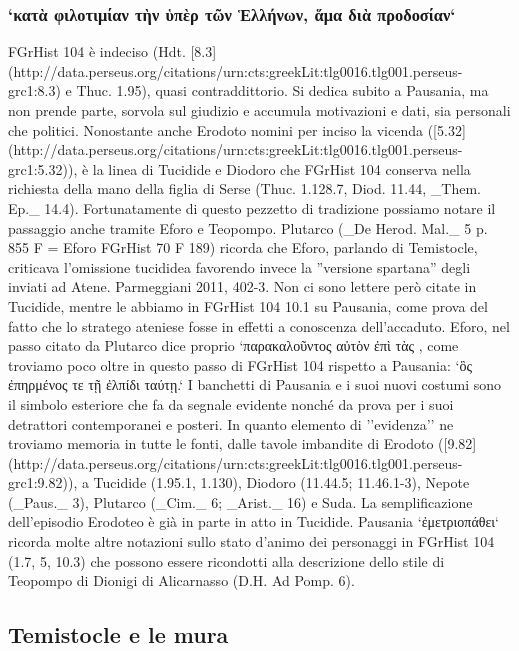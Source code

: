         \subsubsection{`κατὰ φιλοτιμίαν τὴν ὑπὲρ τῶν Ἑλλήνων, ἅμα διὰ προδοσίαν`}
        FGrHist 104 è indeciso (Hdt. [8.3](http://data.perseus.org/citations/urn:cts:greekLit:tlg0016.tlg001.perseus-grc1:8.3) e Thuc. 1.95), quasi contraddittorio. Si dedica subito a Pausania, ma non prende parte, sorvola sul giudizio e accumula motivazioni e dati, sia personali che politici. Nonostante anche Erodoto nomini per inciso la vicenda ([5.32](http://data.perseus.org/citations/urn:cts:greekLit:tlg0016.tlg001.perseus-grc1:5.32)), è la linea di Tucidide e  Diodoro che FGrHist 104 conserva nella richiesta della mano della figlia di Serse  (Thuc. 1.128.7, Diod. 11.44, _Them. Ep._  14.4). Fortunatamente di questo pezzetto di tradizione possiamo notare il passaggio anche tramite Eforo e Teopompo. Plutarco (_De Herod. Mal._ 5 p. 855 F = Eforo FGrHist 70 F 189) ricorda che Eforo, parlando di Temistocle, criticava l'omissione tucididea favorendo invece la ''versione spartana'' degli inviati ad Atene. Parmeggiani 2011, 402-3. Non ci sono lettere però citate in Tucidide, mentre le abbiamo in FGrHist 104 10.1 su Pausania, come prova del fatto che lo stratego ateniese fosse in effetti a conoscenza dell'accaduto. Eforo, nel passo citato da Plutarco dice proprio `παρακαλοῦντος αὐτὸν ἐπὶ τὰς , come troviamo poco oltre in questo passo di FGrHist 104 rispetto a Pausania: `ὃς ἐπηρμένος τε τῇ ἐλπίδι ταύτῃ.` 
            I banchetti di Pausania  e i suoi nuovi costumi sono il simbolo esteriore che fa da segnale evidente nonché da prova per i suoi detrattori contemporanei e posteri. In quanto elemento di ''evidenza'' ne troviamo memoria in tutte le fonti, dalle tavole imbandite di Erodoto ([9.82](http://data.perseus.org/citations/urn:cts:greekLit:tlg0016.tlg001.perseus-grc1:9.82)), a Tucidide (1.95.1, 1.130),  Diodoro (11.44.5; 11.46.1-3),  Nepote (_Paus._ 3), Plutarco (_Cim._ 6; _Arist._ 16) e Suda. La semplificazione dell'episodio Erodoteo è già in parte in atto in Tucidide.
            Pausania  `ἐμετριοπάθει` ricorda molte altre notazioni sullo stato d'animo dei personaggi in FGrHist 104 (1.7, 5, 10.3) che possono essere ricondotti alla descrizione dello stile di Teopompo  di Dionigi di Alicarnasso (D.H. Ad Pomp. 6). 
            \subsection*{Temistocle e le mura}
